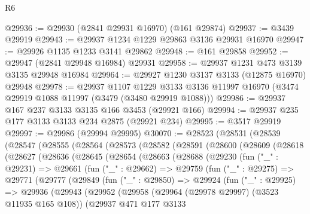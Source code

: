 \begin{lexlean}{R6}
\begin{coremodule}
@29936 := @29930 (@2841 @29931 @16970) (@161 @29874)
@29937 := @3439 @29919
@29943 := @29937 @1234 @1229 @29863 @3136 @29931 @16970
@29947 := @29926 @1135 @1233 @3141 @29862
@29948 := @161 @29858
@29952 := @29947 (@2841 @29948 @16984) @29931
@29958 := @29937 @1231 @473 @3139 @3135 @29948 @16984
@29964 := @29927 @1230 @3137 @3133 (@12875 @16970) @29948
@29978 := @29937
    @1107
    @1229
    @3133
    @3136
    @11997
    @16970
    (@3474 @29919 @1088 @11997 (@3479 (@3480 @29919 @1088)))
@29986 := @29937 @167 @237 @3133 @3135 @166 @3453 (@29921 @166)
@29994 := @29937 @235 @177 @3133 @3133 @234 @2875 (@29921 @234)
@29995 := @3517 @29919
@29997 := @29986 (@29994 @29995)
@30070 := @28523
    (@28531
      (@28539
        (@28547
          (@28555
            (@28564
              (@28573
                (@28582
                  (@28591
                    (@28600
                      (@28609
                        (@28618
                          (@28627
                            (@28636
                              (@28645
                                (@28654
                                  (@28663
                                    (@28688
                                      (@29230
                                        (fun ("_" : @29231) =>
                                        @29661
                                          (fun ("_" : @29662) =>
                                          @29759
                                            (fun ("_" : @29275) =>
                                            @29771
                                              (@29777
                                                (@29849
                                                  (fun ("_" : @29850) =>
                                                  @29924
                                                    (fun ("_" : @29925) =>
                                                    @29936
                                                      (@29943
                                                        (@29952
                                                          (@29958
                                                            (@29964
                                                              (@29978 @29997)
                                                              (@3523 @11935 @165 @108))
                                                            (@29937
                                                              @471
                                                              @177
                                                              @3133

\end{coremodule}
\end{lexlean}

